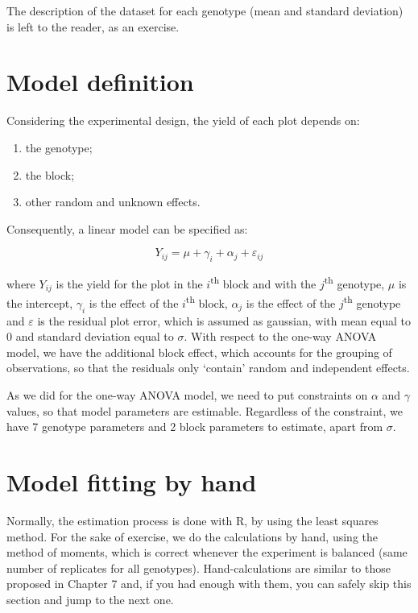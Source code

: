 \documentclass[a4paper,12pt,oneside]{book}
\providecommand{\tightlist}{%
  \setlength{\itemsep}{0pt}\setlength{\parskip}{0pt}}
\begin{document}
The description of the dataset for each genotype (mean and standard deviation) is left to the reader, as an exercise.

\hypertarget{model-definition-1}{%
\section{Model definition}\label{model-definition-1}}

Considering the experimental design, the yield of each plot depends on:

\begin{enumerate}
\def\labelenumi{\arabic{enumi}.}
\tightlist
\item
  the genotype;
\item
  the block;
\item
  other random and unknown effects.
\end{enumerate}

Consequently, a linear model can be specified as:

\[ Y_{ij} = \mu + \gamma_i + \alpha_j + \varepsilon_{ij}\]

where \(Y_{ij}\) is the yield for the plot in the \(i\)\textsuperscript{th} block and with the \(j\)\textsuperscript{th} genotype, \(\mu\) is the intercept, \(\gamma_i\) is the effect of the \(i\)\textsuperscript{th} block, \(\alpha_j\) is the effect of the \(j\)\textsuperscript{th} genotype and \(\varepsilon\) is the residual plot error, which is assumed as gaussian, with mean equal to 0 and standard deviation equal to \(\sigma\). With respect to the one-way ANOVA model, we have the additional block effect, which accounts for the grouping of observations, so that the residuals only `contain' random and independent effects.

As we did for the one-way ANOVA model, we need to put constraints on \(\alpha\) and \(\gamma\) values, so that model parameters are estimable. Regardless of the constraint, we have 7 genotype parameters and 2 block parameters to estimate, apart from \(\sigma\).

\hypertarget{model-fitting-by-hand}{%
\section{Model fitting by hand}\label{model-fitting-by-hand}}

Normally, the estimation process is done with R, by using the least squares method. For the sake of exercise, we do the calculations by hand, using the method of moments, which is correct whenever the experiment is balanced (same number of replicates for all genotypes). Hand-calculations are similar to those proposed in Chapter 7 and, if you had enough with them, you can safely skip this section and jump to the next one.
\end{document}
